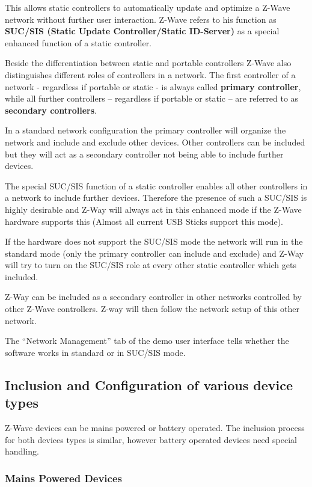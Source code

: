 This allows static controllers to automatically update and optimize a Z-Wave network without further user interaction.  Z-Wave refers to 
his function as {\bf SUC/SIS (Static Update Controller/Static ID-Server) }as a special enhanced function of a static controller.

Beside the differentiation between static and portable controllers Z-Wave also distinguishes different roles of controllers in a network. 
The first controller of a network  - regardless if portable or static  - is always called {\bf primary controller}, while all further controllers – regardless 
if portable or static – are referred to as {\bf secondary controllers}.

In a standard network configuration the primary controller will organize the network and include and exclude other devices. Other controllers 
can be included but they will act as a secondary controller not being able to include further devices.

The special SUC/SIS function of a static controller enables all other controllers in a network to include further devices. Therefore the presence
 of such a SUC/SIS is highly desirable and Z-Way will always act in this enhanced mode if the Z-Wave hardware supports this  (Almost all current 
 USB Sticks support this mode).

If the hardware does not support the SUC/SIS mode the network will run in the standard mode (only the primary controller can include and exclude) 
 and Z-Way will try to turn on the SUC/SIS role at every other static controller which gets included.

Z-Way can be included as a secondary controller in other networks controlled by other Z-Wave controllers. Z-way will then follow the network 
 setup of this other network.

The “Network Management” tab of the demo user interface tells whether the software works in standard or in SUC/SIS mode.

\subsection{Inclusion and Configuration of various device types}

Z-Wave devices can be mains powered or battery operated.  The inclusion process for both devices types is similar, however battery operated devices need special handling.

\subsubsection{Mains Powered Devices}

